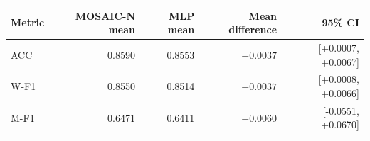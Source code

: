 \begin{tabular}{lrrrr}
\toprule
Metric & MOSAIC-N mean & MLP mean & Mean difference & 95\% CI \\
\midrule
ACC & 0.8590 & 0.8553 & $+0.0037$ & [+0.0007, +0.0067] \\
W-F1 & 0.8550 & 0.8514 & $+0.0037$ & [+0.0008, +0.0066] \\
M-F1 & 0.6471 & 0.6411 & $+0.0060$ & [-0.0551, +0.0670] \\
\bottomrule
\end{tabular}

